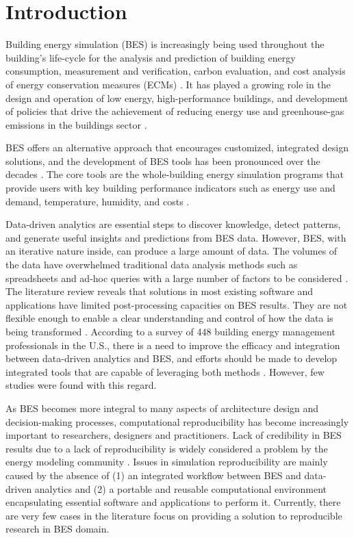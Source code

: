 \documentclass[3p, times]{elsarticle} %
\begin{document}
\hypertarget{introduction}{%
\section{Introduction}\label{introduction}}

Building energy simulation (BES) is increasingly being used throughout the
building's life-cycle for the analysis and prediction of building energy
consumption, measurement and verification, carbon evaluation, and cost analysis
of energy conservation measures (ECMs) \citep{Chong2017, Kneifel2010}.
It has played a growing role in the design and operation of low energy,
high-performance buildings, and development of policies that drive the
achievement of reducing energy use and greenhouse-gas emissions in the
buildings sector \citep{Hong2018}.

BES offers an alternative approach that encourages customized, integrated
design solutions, and the development of BES tools has been pronounced over the
decades \citep{Hong2000, Hong2018, Chen2017Automatic}.
The core tools are the whole-building energy simulation
programs that provide users with key building performance indicators such as
energy use and demand, temperature, humidity, and costs \citep{Crawley2008a}.

Data-driven analytics are essential steps to discover knowledge, detect
patterns, and generate useful insights and predictions from BES data.
However, BES, with an iterative nature inside, can produce a large amount
of data. The volumes of the data have overwhelmed traditional data
analysis methods such as spreadsheets and ad-hoc queries with a large number of
factors to be considered \citep{Kim2011}.
The literature review reveals that solutions in most existing software and
applications have limited post-processing capacities on BES results. They are
not flexible enough to enable a clear understanding and control of how the data
is being transformed \citep{Miller2013, Attia2013a}.
According to a survey of 448 building energy management professionals in the
U.S., there is a need to improve the efficacy and integration between
data-driven analytics and BES, and efforts should be made to develop integrated
tools that are capable of leveraging both methods \citep{Srivastava2019}.
However, few studies were found with this regard.

As BES becomes more integral to many aspects of architecture design and
decision-making processes, computational reproducibility has become increasingly
important to researchers, designers and practitioners.
Lack of credibility in BES results due to a lack of reproducibility is widely
considered a problem by the energy modeling community \citep{Fleming2012}.
Issues in simulation reproducibility are mainly caused by the absence of (1) an
integrated workflow between BES and data-driven analytics and (2) a portable
and reusable computational environment encapsulating essential software and
applications to perform it.
Currently, there are very few cases in the literature focus on providing a
solution to reproducible research in BES domain.
\end{document}

